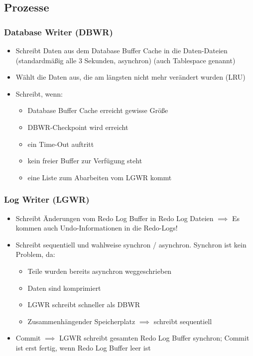 \subsection{Prozesse}
\subsubsection{Database Writer (DBWR)}
\begin{itemize}
    \item Schreibt Daten aus dem Database Buffer Cache in die Daten-Dateien (standardmäßig alle 3 Sekunden, asynchron) (auch Tablespace genannt)
    \item Wählt die Daten aus, die am längsten nicht mehr verändert wurden (LRU)
    \item Schreibt, wenn:
    \begin{itemize}
        \item Database Buffer Cache erreicht gewisse Größe
        \item DBWR-Checkpoint wird erreicht
        \item ein Time-Out auftritt
        \item kein freier Buffer zur Verfügung steht
        \item eine Liste zum Abarbeiten vom LGWR kommt
    \end{itemize}
\end{itemize}

\subsubsection{Log Writer (LGWR)}
\begin{itemize}
    \item Schreibt Änderungen vom Redo Log Buffer in Redo Log Dateien $\implies$ Es kommen auch Undo-Informationen in die Redo-Logs!
    \item Schreibt sequentiell und wahlweise synchron / asynchron. Synchron ist kein Problem, da:
    \begin{itemize}
        \item Teile wurden bereits asynchron weggeschrieben
        \item Daten sind komprimiert
        \item LGWR schreibt schneller als DBWR
        \item Zusammenhängender Speicherplatz $\implies$ schreibt sequentiell
    \end{itemize}
    \item Commit $\implies$ LGWR schreibt gesamten Redo Log Buffer synchron; Commit ist erst fertig, wenn Redo Log Buffer leer ist
\end{itemize}

